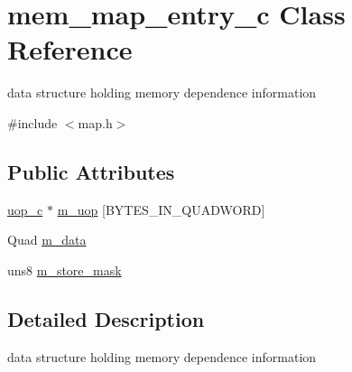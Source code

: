 \hypertarget{classmem__map__entry__c}{
\section{mem\_\-map\_\-entry\_\-c Class Reference}
\label{classmem__map__entry__c}
}


data structure holding memory dependence information  




{\ttfamily \#include $<$map.h$>$}

\subsection*{Public Attributes}
\begin{DoxyCompactItemize}
\item 
\hyperlink{classuop__c}{uop\_\-c} $\ast$ \hyperlink{classmem__map__entry__c_a3ca3d13eb2521e21ed2776293f4f20c4}{m\_\-uop} \mbox{[}BYTES\_\-IN\_\-QUADWORD\mbox{]}
\item 
Quad \hyperlink{classmem__map__entry__c_a3d7080bd5290849a0ee2482d38a66cf1}{m\_\-data}
\item 
uns8 \hyperlink{classmem__map__entry__c_aa4d50f7f30287bd33107a8579f898be5}{m\_\-store\_\-mask}
\end{DoxyCompactItemize}


\subsection{Detailed Description}
data structure holding memory dependence information 

